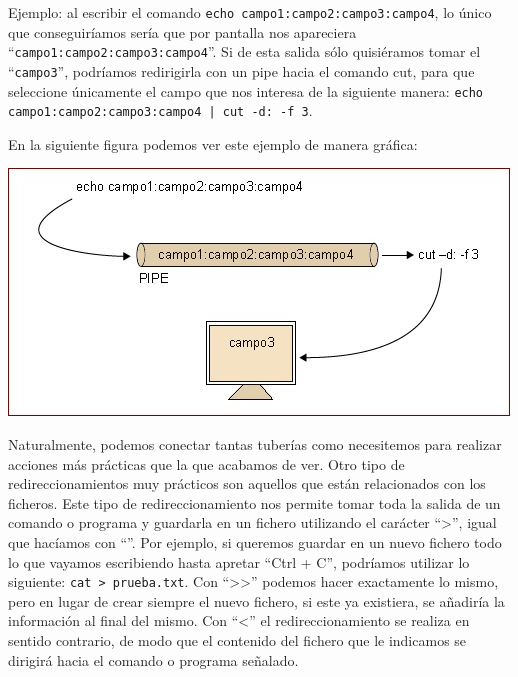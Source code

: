 \documentclass[12pt]{article}
\begin{document}
Ejemplo: al escribir el comando 
\texttt{echo campo1:campo2:campo3:campo4}, lo único que conseguiríamos sería que por 
pantalla nos apareciera ``\texttt{campo1:campo2:campo3:campo4}''. Si de esta salida sólo 
quisiéramos tomar el  ``\texttt{campo3}'', podríamos redirigirla con un pipe hacia el 
comando cut, para que seleccione únicamente el campo que nos interesa de la siguiente manera: 
\texttt{echo campo1:campo2:campo3:campo4 | cut -d: -f 3}. 

En la siguiente figura podemos ver este ejemplo de manera gráfica:

\begin{center}
 \includegraphics{./img/redireccionamiento.jpg}
\end{center}


Naturalmente, podemos conectar tantas tuberías como necesitemos para realizar 
acciones más prácticas que la que acabamos de ver. Otro tipo de 
redireccionamientos muy prácticos son aquellos que están relacionados con los 
ficheros. Este tipo de redireccionamiento nos permite tomar toda la salida de 
un comando o programa y guardarla en un fichero utilizando el carácter ``\textgreater'', 
igual que hacíamos con ``\textbar''. Por ejemplo, si queremos guardar en un nuevo 
fichero todo lo que vayamos escribiendo hasta apretar ``Ctrl + C'', podríamos 
utilizar lo siguiente: \texttt{cat > prueba.txt}. Con ``\textgreater \textgreater'' 
podemos hacer exactamente 
lo mismo, pero en lugar de crear siempre el nuevo fichero, si este ya 
existiera, se añadiría la información al final del mismo. Con ``\textless'' el 
redireccionamiento se realiza en sentido contrario, de modo que el 
contenido del fichero que le indicamos se dirigirá hacia el comando o programa 
señalado.
\end{document}
